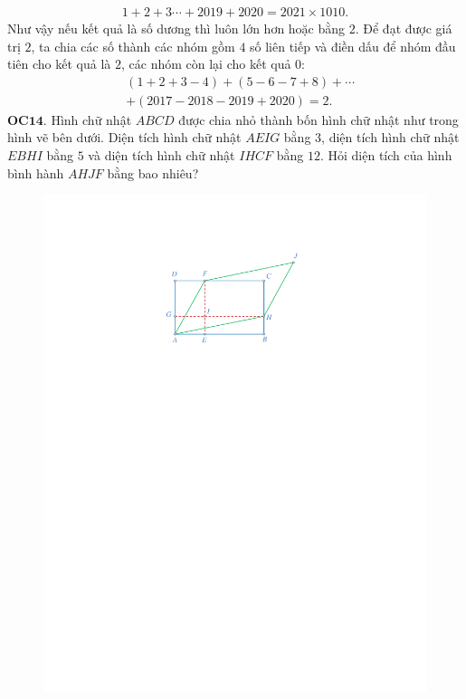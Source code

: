 \begin{multicols}{2}
	\begin{align*}
		1 +  2 + 3   \cdots + 2019 + 2020= 2021 \!\times\! 1010.
	\end{align*}
	Như vậy nếu kết quả là số dương thì luôn lớn hơn hoặc bằng $2$. Để đạt được giá trị $2$, ta chia các số thành các nhóm gồm $4$ số liên tiếp và điền dấu để nhóm đầu tiên cho kết quả là $2$, các nhóm còn lại cho kết quả $0$:
	\begin{align*}
		&(1+2+3-4)+(5-6-7+8)+\cdots \\
		&+(2017-2018-2019+2020)=2.
	\end{align*}
	{\bf\color{cackithi} OC$\pmb{14.}$} Hình chữ nhật $ABCD$ được chia nhỏ thành bốn hình chữ nhật như trong hình vẽ bên dưới. Diện tích hình chữ nhật $AEIG$ bằng $3$, diện tích hình chữ nhật $EBHI$ bằng $5$ và diện tích hình chữ nhật $IHCF$ bằng $12$. Hỏi diện tích của hình bình hành $AHJF$ bằng bao nhiêu? 
	\begin{figure}[H]
		\vspace*{-10pt}
		\centering
		\captionsetup{labelformat= empty, justification=centering}
		\includegraphics[width= 0.9\linewidth]{OC14}
		\vspace*{-15pt}

\end{figure}
\end{multicols}
